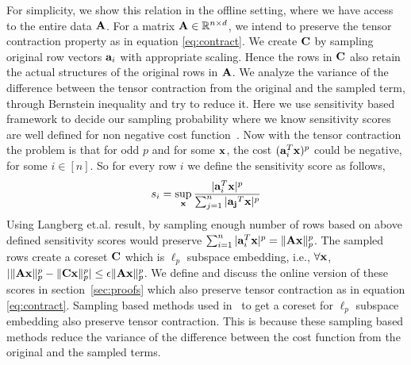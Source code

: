 For simplicity, we show this relation in the offline setting, where we have access to the entire data $\mathbf{A}$.
For a matrix $\mathbf{A} \in \mathbb{R}^{n \times d}$, we intend to preserve the tensor contraction property as in equation \eqref{eq:contract}. We create $\mathbf{C}$ by sampling original row vectors $\mathbf{a}_{i}$ with appropriate scaling. Hence the rows in $\mathbf{C}$ also retain the actual structures of the original rows in $\mathbf{A}$.
We analyze the variance of the difference between the tensor contraction from the original and the sampled term, through Bernstein inequality \cite{dubhashi2009concentration} and try to reduce it. 
Here we use sensitivity based framework to decide our sampling probability where we know sensitivity scores are well defined for non negative cost function~\cite{langberg2010universal}. Now with the tensor contraction the problem is that for odd $p$ and for some $\mathbf{x}$, the cost $(\mathbf{a}_{i}^{T}\mathbf{x})^{p}$ could be negative, for some $i \in [n]$. So for every row $i$ we define the sensitivity score as follows,
% 
\begin{equation}{\label{eqn:sensitivity}}
 s_{i} = \sup_{\mathbf{x}}\frac{|\mathbf{a}_{i}^{T}\mathbf{x}|^{p}}{\sum_{j=1}^{n}|\mathbf{a_{j}}^{T}\mathbf{x}|^{p}}
\end{equation}
% 
Using Langberg et.al. \cite{langberg2010universal} result, by sampling enough number of rows based on above defined sensitivity scores would preserve $\sum_{i=1}^{n}|\mathbf{a}_{i}^{T}\mathbf{x}|^{p} = \|\mathbf{A}\mathbf{x}\|_{p}^{p}$. The sampled rows create a coreset $\mathbf{C}$ which is $\ell_{p}$ subspace embedding, i.e., $\forall \mathbf{x}$, $|\|\mathbf{A}\mathbf{x}\|_{p}^{p} - \|\mathbf{C}\mathbf{x}\|_{p}^{p}| \leq \epsilon \|\mathbf{A}\mathbf{x}\|_{p}^{p}$. We define and discuss the online version of these scores in section~\ref{sec:proofs} which also preserve tensor contraction as in equation \eqref{eq:contract}.
Sampling based methods used in~\cite{dasgupta2009sampling, cohen2015p, clarkson2016fast} to get a coreset for $\ell_{p}$ subspace embedding also preserve tensor contraction. This is because these sampling based methods reduce the variance of the difference between the cost function from the original and the sampled terms.

